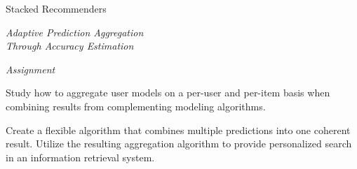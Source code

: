 \begin{narrow}

\null\vspace{6em}

{
  \centering
  \LARGE{Stacked Recommenders}\\
  \vspace{1em}
  
  \itshape
  \color{red}
  \large{Adaptive Prediction Aggregation}\\
  \large{Through Accuracy Estimation}\\
}

\vspace{5em}

{
  \centering
  \itshape
  Assignment\\
}
\vspace{1em}

Study how to aggregate user models on a per-user and per-item
basis when combining results from complementing modeling algorithms.

Create a flexible algorithm that combines multiple predictions
into one coherent result.
Utilize the resulting aggregation algorithm
to provide personalized search in an information retrieval system.

\end{narrow}
\vfill
\clearpage

